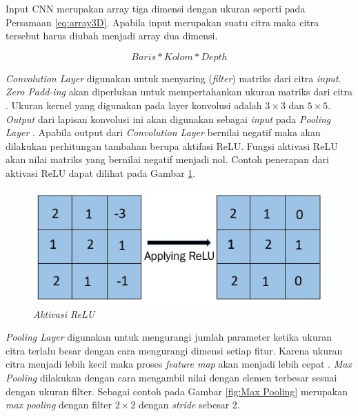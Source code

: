 Input CNN merupakan array tiga dimensi dengan ukuran seperti pada Persamaan \ref{eq:array3D}. Apabila input merupakan suatu citra maka citra tersebut harus diubah menjadi array dua dimensi. 

\begin{equation}
    \label{eq:array3D}
    Baris * Kolom * Depth
\end{equation}

\emph{Convolution Layer} digunakan untuk menyaring (\emph{filter}) matriks dari citra \emph{input}. \emph{Zero Padd-ing} akan diperlukan untuk mempertahankan ukuran matriks dari citra \parencite{dwitama2019klasifikasi}. Ukuran kernel yang digunakan pada layer konvolusi adalah \(3 \times 3\) dan \(5 \times 5\). \emph{Output} dari lapisan konvolusi ini akan digunakan sebagai \emph{input} pada \emph{Pooling Layer} \parencite{hakim2018penerapan}. Apabila output dari \emph{Convolution Layer} bernilai negatif maka akan dilakukan perhitungan tambahan berupa aktifasi ReLU. Fungsi aktivasi ReLU akan nilai matriks yang bernilai negatif menjadi nol. Contoh penerapan dari aktivasi ReLU dapat dilihat pada Gambar \ref{fig:Aktivasi ReLU}.

\begin{figure} [ht] \centering
    \includegraphics[scale=1]{gambar/aktivasiReLU.png}
    \caption{\emph{Aktivasi ReLU}}
    \label{fig:Aktivasi ReLU}
\end{figure}

\emph{Pooling Layer} digunakan untuk mengurangi jumlah parameter ketika ukuran citra terlalu besar dengan cara mengurangi dimensi setiap fitur. Karena ukuran citra menjadi lebih kecil maka proses \emph{feature map} akan menjadi lebih cepat \parencite{hakim2018penerapan}. \emph{Max Pooling} dilakukan dengan cara mengambil nilai dengan elemen terbesar sesuai dengan ukuran filter. Sebagai contoh pada Gambar \ref{fig:Max Pooling} merupakan \emph{max pooling} dengan filter \(2 \times 2\) dengan \emph{stride} sebesar 2.

